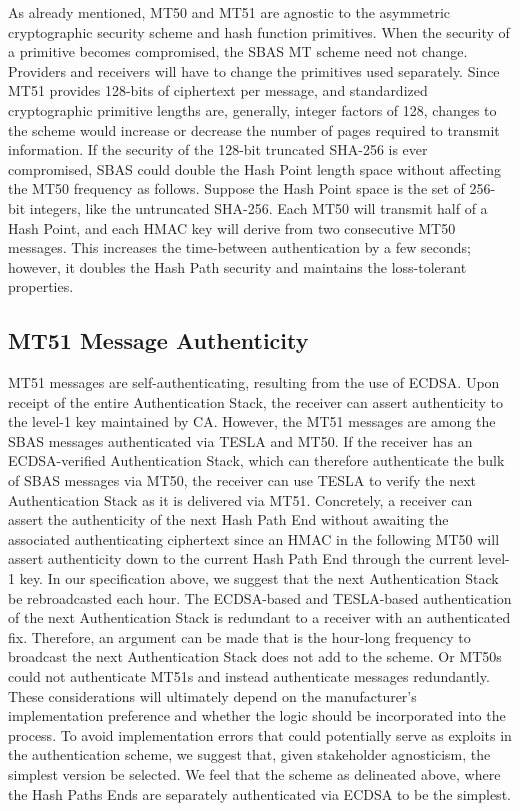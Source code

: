 \documentclass[letterpaper,times]{IONconf/IONconf}
\begin{document}
As already mentioned, MT50 and MT51 are agnostic to the asymmetric cryptographic security scheme and hash function primitives.
When the security of a primitive becomes compromised, the SBAS MT scheme need not change.
Providers and receivers will have to change the primitives used separately.
Since MT51 provides 128-bits of ciphertext per message, and standardized cryptographic primitive lengths are, generally, integer factors of 128, changes to the scheme would increase or decrease the number of pages required to transmit information.
If the security of the 128-bit truncated SHA-256 is ever compromised, SBAS could double the Hash Point length space without affecting the MT50 frequency as follows.
Suppose the Hash Point space is the set of 256-bit integers, like the untruncated SHA-256.
Each MT50 will transmit half of a Hash Point, and each HMAC key will derive from two consecutive MT50 messages.
This increases the time-between authentication by a few seconds; however, it doubles the Hash Path security and maintains the loss-tolerant properties.

\subsection{MT51 Message Authenticity}

MT51 messages are self-authenticating, resulting from the use of ECDSA.
Upon receipt of the entire Authentication Stack, the receiver can assert authenticity to the level-1 key maintained by CA.
However, the MT51 messages are among the SBAS messages authenticated via TESLA and MT50.
If the receiver has an ECDSA-verified Authentication Stack, which can therefore authenticate the bulk of SBAS messages via MT50, the receiver can use TESLA to verify the next Authentication Stack as it is delivered via MT51.
Concretely, a receiver can assert the authenticity of the next Hash Path End without awaiting the associated authenticating ciphertext since an HMAC in the following MT50 will assert authenticity down to the current Hash Path End through the current level-1 key.
In our specification above, we suggest that the next Authentication Stack be rebroadcasted each hour.
The ECDSA-based and TESLA-based authentication of the next Authentication Stack is redundant to a receiver with an authenticated fix.
Therefore, an argument can be made that is the hour-long frequency to broadcast the next Authentication Stack does not add to the scheme.
Or MT50s could not authenticate MT51s and instead authenticate messages redundantly.
These considerations will ultimately depend on the manufacturer's implementation preference and whether the logic should be incorporated into the process.
To avoid implementation errors that could potentially serve as exploits in the authentication scheme, we suggest that, given stakeholder agnosticism, the simplest version be selected.
We feel that the scheme as delineated above, where the Hash Paths Ends are separately authenticated via ECDSA to be the simplest.
\end{document}
